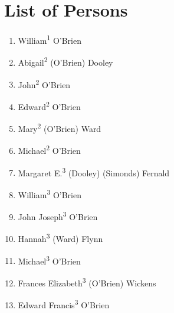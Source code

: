 \chapter{List of Persons}
\begin{enumerate}
	\item \label{per:William1OBrien} William\textsuperscript{1} O'Brien
	\item \label{per:Abigail2OBrien} Abigail\textsuperscript{2} (O'Brien) Dooley
	\item \label{per:John2OBrien} John\textsuperscript{2} O'Brien
	\item \label{per:Edward2OBrien} Edward\textsuperscript{2} O'Brien
	\item \label{per:Mary2OBrien} Mary\textsuperscript{2} (O'Brien) Ward
	\item \label{per:Michael2OBrien} Michael\textsuperscript{2} O'Brien
	\item \label{per:Margaret3Dooley} Margaret E.\textsuperscript{3} (Dooley) (Simonds) Fernald
	\item \label{per:William3OBrien} William\textsuperscript{3} O'Brien
	\item \label{per:John3OBrien} John Joseph\textsuperscript{3} O'Brien
	\item \label{per:Hannah3Ward} Hannah\textsuperscript{3} (Ward) Flynn
	\item \label{per:Michael3OBrien} Michael\textsuperscript{3} O'Brien
	\item \label{per:Frances3OBrien} Frances Elizabeth\textsuperscript{3} (O'Brien) Wickens
	\item \label{per:Edward3OBrien} Edward Francis\textsuperscript{3} O'Brien
	

\end{enumerate}

